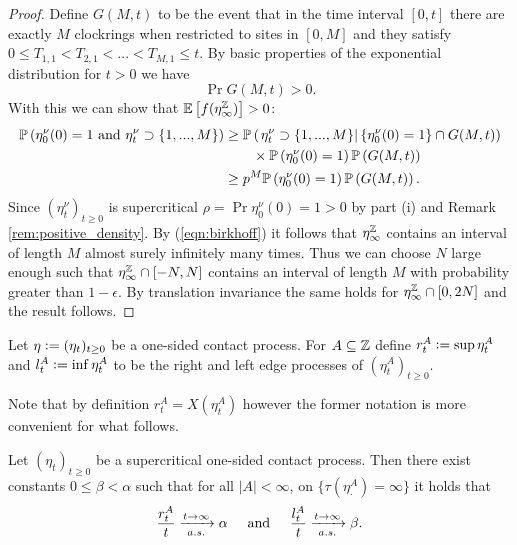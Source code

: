 \begin{proof}
Define $G(M, t)$ to be the event that in the time interval $[0, t]$ there are exactly $M$ clockrings when restricted to sites in $[0, M]$ and they satisfy $0 \leq T_{1, 1} < T_{2, 1} < ... < T_{M, 1} \leq t$. By basic properties of the exponential distribution for $t > 0$ we have
\begin{equation}\nonumber
\Pr{G(M, t)} > 0. 
\end{equation}
With this we can show that $\mathbb{E}\left[ f(\eta^{\mathbb{Z}}_\infty) \right] > 0$: 
\begin{align*}
\mathbb{P} \left( \eta^\nu_0 (0) = 1 \text{ and } \eta^\nu_t \supset \{1, ..., M\} \right) &\geq \mathbb{P} \left( \left. \eta^\nu_t \supset \{1, ..., M\} \right| \{\eta^\nu_0 (0) = 1\} \cap G(M, t) \right) \\ 
&\qquad \times \mathbb{P} \left( \eta^\nu_0 (0) = 1 \right) \mathbb{P} \left( G(M, t) \right) \\
&\geq p^M \mathbb{P} \left( \eta^\nu_0 (0) = 1 \right) \mathbb{P} \left( G(M, t) \right). 
\end{align*}
Since $(\eta^\nu_t)_{t \geq 0}$ is supercritical $\rho = \Pr{\eta^\nu_0 (0) = 1} > 0$ by part (i) and Remark \ref{rem:positive_density}. By (\ref{eqn:birkhoff}) it follows that $\eta^{\mathbb{Z}}_\infty$ contains an interval of length $M$ almost surely infinitely many times. Thus we can choose $N$ large enough such that $\eta^{\mathbb{Z}}_\infty \cap [-N, N]$ contains an interval of length $M$ with probability greater than $1 - \epsilon$. By translation invariance the same holds for $\eta^{\mathbb{Z}}_\infty \cap [0, 2N]$ and the result follows. 
\end{proof}

\begin{definition}
Let $\eta \vcentcolon= (\eta_t)_{t \geq 0}$ be a one-sided contact process. For $A \subseteq \mathbb{Z}$ define $r^A_t \vcentcolon= \sup\eta^A_t$ and $l^A_t \vcentcolon= \inf\eta^A_t$ to be the right and left edge processes of $(\eta^A_t)_{t \geq 0}$. 
\end{definition}
\begin{remark}
Note that by definition $r^A_t = X(\eta^A_t)$ however the former notation is more convenient for what follows. 
\end{remark}

\begin{theorem}\label{thm:convergence}
Let $(\eta_t)_{t \geq 0}$ be a supercritical one-sided contact process. Then there exist constants $0 \leq \beta < \alpha$ such that for all $|A| < \infty$, on $\{\tau(\eta^A_\cdot) = \infty\}$ it holds that
\begin{equation}\nonumber
\frac{r^A_t}{t} \xrightarrow[a.s.]{t \rightarrow \infty} \alpha \hspace{5mm} \text{and} \hspace{5mm} \frac{l^A_t}{t} \xrightarrow[a.s.]{t \rightarrow \infty} \beta.
\end{equation}
\end{theorem}

